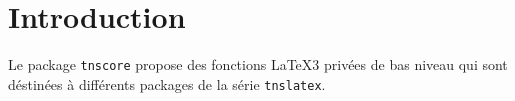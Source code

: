 \documentclass[12pt,a4paper]{article}
\begin{document}
\section{Introduction}

Le package \verb#tnscore# propose des fonctions \LaTeX3 privées de bas niveau qui sont déstinées à différents packages de la série \verb#tnslatex#.
\end{document}
